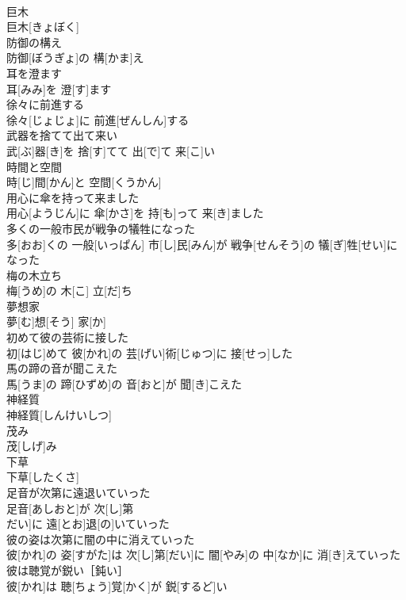 \documentclass[8pt]{extreport}
\begin{document}
\begin{CJK}{UTF8}{min}
\\	巨木	
\\	巨木[きょぼく]
\\	防御の構え	
\\	防御[ぼうぎょ]の 構[かま]え
\\	耳を澄ます	
\\	耳[みみ]を 澄[す]ます
\\	徐々に前進する	
\\	徐々[じょじょ]に 前進[ぜんしん]する
\\	武器を捨てて出て来い	
\\	武[ぶ]器[き]を 捨[す]てて 出[で]て 来[こ]い
\\	時間と空間	
\\	時[じ]間[かん]と 空間[くうかん]
\\	用心に傘を持って来ました	
\\	用心[ようじん]に 傘[かさ]を 持[も]って 来[き]ました
\\	多くの一般市民が戦争の犠牲になった	
\\	多[おお]くの 一般[いっぱん] 市[し]民[みん]が 戦争[せんそう]の 犠[ぎ]牲[せい]になった
\\	梅の木立ち	
\\	梅[うめ]の 木[こ] 立[だ]ち
\\	夢想家	
\\	夢[む]想[そう] 家[か]
\\	初めて彼の芸術に接した	
\\	初[はじ]めて 彼[かれ]の 芸[げい]術[じゅつ]に 接[せっ]した
\\	馬の蹄の音が聞こえた	
\\	馬[うま]の 蹄[ひずめ]の 音[おと]が 聞[き]こえた
\\	神経質	
\\	神経質[しんけいしつ]
\\	茂み	
\\	茂[しげ]み
\\	下草	
\\	下草[したくさ]
\\	足音が次第に遠退いていった	
\\	足音[あしおと]が 次[し]第
\\	だい]に 遠[とお]退[の]いていった
\\	彼の姿は次第に闇の中に消えていった	
\\	彼[かれ]の 姿[すがた]は 次[し]第[だい]に 闇[やみ]の 中[なか]に 消[き]えていった
\\	彼は聴覚が鋭い［鈍い］	
\\	彼[かれ]は 聴[ちょう]覚[かく]が 鋭[するど]い

\end{CJK}
\end{document}
